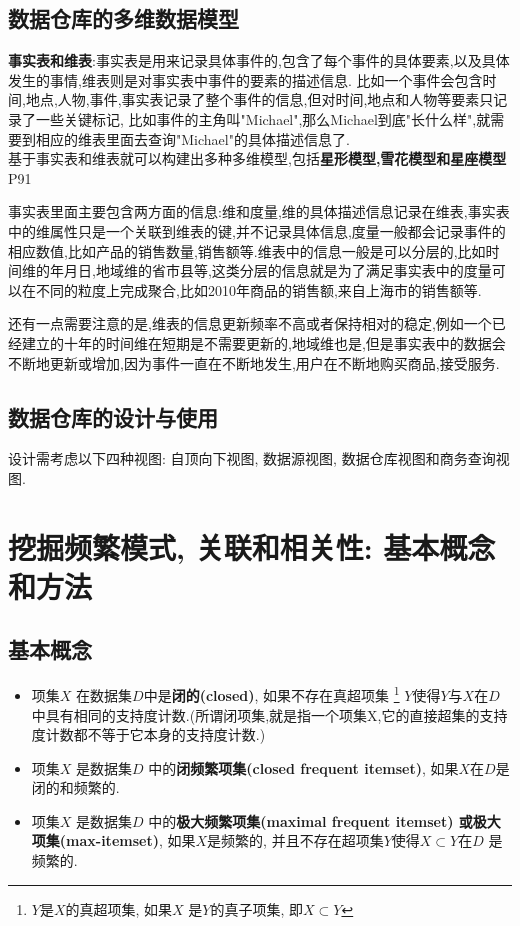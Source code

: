 \documentclass{article}
\begin{document}
\subsection{数据仓库的多维数据模型}
\textbf{事实表和维表}:事实表是用来记录具体事件的,包含了每个事件的具体要素,以及具体发生的事情,维表则是对事实表中事件的要素的描述信息.
比如一个事件会包含时间,地点,人物,事件,事实表记录了整个事件的信息,但对时间,地点和人物等要素只记录了一些关键标记,
比如事件的主角叫"Michael",那么Michael到底"长什么样",就需要到相应的维表里面去查询"Michael"的具体描述信息了.\\
基于事实表和维表就可以构建出多种多维模型,包括\textbf{星形模型,雪花模型和星座模型}P91

事实表里面主要包含两方面的信息:维和度量,维的具体描述信息记录在维表,事实表中的维属性只是一个关联到维表的键,并不记录具体信息,度量一般都会记录事件的相应数值,比如产品的销售数量,销售额等.维表中的信息一般是可以分层的,比如时间维的年月日,地域维的省市县等,这类分层的信息就是为了满足事实表中的度量可以在不同的粒度上完成聚合,比如2010年商品的销售额,来自上海市的销售额等.

还有一点需要注意的是,维表的信息更新频率不高或者保持相对的稳定,例如一个已经建立的十年的时间维在短期是不需要更新的,地域维也是,但是事实表中的数据会不断地更新或增加,因为事件一直在不断地发生,用户在不断地购买商品,接受服务.

\subsection{数据仓库的设计与使用}
设计需考虑以下四种视图: 自顶向下视图, 数据源视图, 数据仓库视图和商务查询视图.

\section{挖掘频繁模式, 关联和相关性: 基本概念和方法}
\subsection{基本概念}
\begin{itemize}
	\item 项集$X$ 在数据集$D$中是\textbf{闭的(closed)}, 如果不存在真超项集
\footnote{$Y$是$X$的真超项集, 如果$X$ 是$Y$的真子项集, 即$X \subset Y$}
$Y$使得$Y$与$X$在$D$中具有相同的支持度计数.(所谓闭项集,就是指一个项集X,它的直接超集的支持度计数都不等于它本身的支持度计数.)
	\item 项集$X$ 是数据集$D$ 中的\textbf{闭频繁项集(closed frequent itemset)}, 如果$X$在$D$是闭的和频繁的.\\
	\item 项集$X$ 是数据集$D$ 中的\textbf{极大频繁项集(maximal frequent itemset) 或极大项集(max-itemset)}, 如果$X$是频繁的, 并且不存在超项集$Y$使得$X \subset Y$在$D$ 是频繁的.
\end{itemize}
\end{document}
